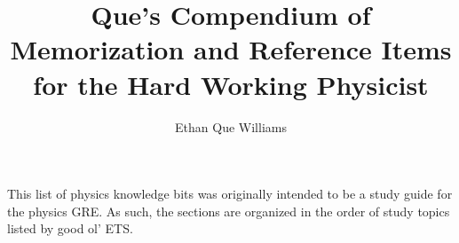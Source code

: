 \documentclass{article}
\begin{document}
\title{Que's Compendium of Memorization and Reference Items for the Hard Working Physicist}
\author{Ethan Que Williams}
\maketitle

This list of physics knowledge bits was originally intended to be a study guide for the physics GRE. As such, the sections are organized in the order of study topics listed by good ol' ETS.


\tableofcontents






















\end{document}
